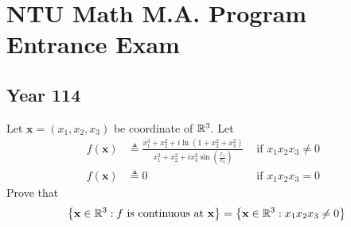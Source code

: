 \documentclass{report}
\begin{document}
\chapter{NTU Math M.A. Program Entrance Exam}
\section{Year 114}
\begin{question}{}{}
Let $\textbf{x}=(x_1,x_2,x_3)$ be coordinate of $\mathbb{R}^3$. Let 
\begin{align*}
  f(\textbf{x})&\triangleq  \frac{x_1^3+x_2^2+i \ln (1+x_2^2+ x_3^2)}{x_1^2+x_2^2+i x_3^2 \sin \left( \frac{x_1}{x_3} \right)} &\text{ if $x_1x_2x_3\neq 0$ }\\
  f(\textbf{x})&\triangleq  0  &\text{ if }x_1x_2x_3=0
\end{align*}
Prove that 
\begin{align*}
\left\{ \textbf{x}\in\mathbb{R}^3:f\text{ is continuous at }\textbf{x} \right\}=\left\{ \textbf{x}\in\mathbb{R}^3:x_1x_2x_3\neq 0 \right\}
\end{align*}
\end{question}
\end{document}
